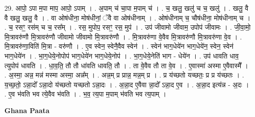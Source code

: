 \documentclass[17pt]{extarticle}
\begin{document}
29. आपो॒ ऽपा म॒पा माप॒ आपो॒ ऽपाम् । . अ॒पाम् च॑ चा॒पा म॒पाम् च॑ । . च॒ खलु॒ खलु॑ च च॒ खलु॑ । . खलु॒ वै वै खलु॒ खलु॒ वै । . वा ओष॑धीना॒ मोष॑धीनां॒ ॅवै वा ओष॑धीनाम् । . ओष॑धीनाम् च॒ चौष॑धीना॒ मोष॑धीनाम् च । . च॒ रसꣳ॒॒ रस॑म् च च॒ रस᳚म् । . रस॒ मुपोप॒ रसꣳ॒॒ रस॒ मुप॑ । . उप॑ जीवामो जीवाम॒ उपोप॑ जीवामः । . जी॒वा॒मो॒ मि॒त्रावरु॑णौ मि॒त्रावरु॑णौ जीवामो जीवामो मि॒त्रावरु॑णौ । . मि॒त्रावरु॑णा वे॒वैव मि॒त्रावरु॑णौ मि॒त्रावरु॑णा वे॒व । . मि॒त्रावरु॑णा॒विति॑ मि॒त्रा - वरु॑णौ । . ए॒व स्वेन॒ स्वेनै॒वैव स्वेन॑ । . स्वेन॑ भाग॒धेये॑न भाग॒धेये॑न॒ स्वेन॒ स्वेन॑ भाग॒धेये॑न । . भा॒ग॒धेये॒नोपोप॑ भाग॒धेये॑न भाग॒धेये॒नोप॑ । . भा॒ग॒धेये॒नेति॑ भाग - धेये॑न । . उप॑ धावति धाव॒ त्युपोप॑ धावति । . धा॒व॒ति॒ तौ तौ धा॑वति धावति॒ तौ । . ता वे॒वैव तौ ता वे॒व । . ए॒वास्मा॑ अस्मा ए॒वैवास्मै᳚ । . अ॒स्मा॒ अन्न॒ मन्न॑ मस्मा अस्मा॒ अन्न᳚म् । . अन्न॒म् प्र प्रान्न॒ मन्न॒म् प्र । . प्र य॑च्छतो यच्छतः॒ प्र प्र य॑च्छतः । . य॒च्छ॒तो॒ ऽन्ना॒दो᳚ ऽन्ना॒दो य॑च्छतो यच्छतो ऽन्ना॒दः । . अ॒न्ना॒द ए॒वैवा न्ना॒दो᳚ ऽन्ना॒द ए॒व । . अ॒न्ना॒द इत्य॑न्न - अ॒दः । . ए॒व भ॑वति भव त्ये॒वैव भ॑वति । . भ॒व॒ त्य॒पा म॒पाम् भ॑वति भव त्य॒पाम् । \newline

\textbf{Ghana Paata } \newline
\end{document}

